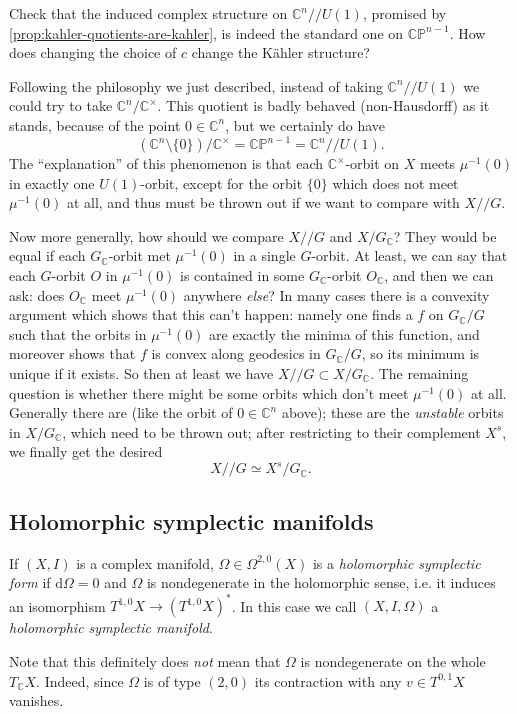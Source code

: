 \documentclass[12pt,letterpaper,reqno]{article}
\numberwithin{equation}{section}
\newcommand{\C}{\ensuremath{\mathbb C}}
\newcommand{\PP}{\ensuremath{\mathbb P}}
\newcommand{\kahler}{K\"ahler\xspace}
\newcommand{\kq}{/\!\!/}
\newcommand{\de}{\mathrm{d}}
\newcommand{\ti}[1]{\textit{#1}}
\begin{document}
\begin{exercise}
Check that the induced complex structure on $\C^n \kq U(1)$,
promised by \autoref{prop:kahler-quotients-are-kahler}, is indeed
the standard one on $\C\PP^{n-1}$. How does changing
the choice of $c$ change the \kahler structure?
\end{exercise}

Following the philosophy we just described, instead of taking
$\C^n \kq U(1)$ we could try to take $\C^n / \C^\times$.
This quotient is badly behaved (non-Hausdorff) as it stands, because of the
point $0 \in \C^n$, but we certainly do have
\begin{equation}
  (\C^n \setminus \{0\}) / \C^\times = \C\PP^{n-1} = \C^n \kq U(1).
\end{equation}
The ``explanation'' of this phenomenon is that each 
$\C^\times$-orbit on $X$ meets $\mu^{-1}(0)$ in
exactly one $U(1)$-orbit, 
except for the orbit $\{0\}$ which does not 
meet $\mu^{-1}(0)$ at all, and thus must be thrown out 
if we want to compare with $X \kq G$.

Now more generally, how should we compare $X \kq G$ and $X / G_\C$?
They would be equal if each $G_\C$-orbit met $\mu^{-1}(0)$
in a single $G$-orbit. At least, we can say that
each $G$-orbit $O$ in $\mu^{-1}(0)$ is contained in some $G_\C$-orbit $O_\C$,
and then we can ask: does $O_\C$ meet $\mu^{-1}(0)$ anywhere \ti{else}?
In many cases there is a convexity argument which shows 
that this can't happen: namely one finds a $f$ on $G_\C / G$ 
such that the orbits in $\mu^{-1}(0)$ are
exactly the minima of this function, and moreover shows that $f$ 
is convex along geodesics in $G_\C / G$, so its minimum is unique
if it exists. So then at least we have 
$X \kq G \subset X / G_\C$. The remaining question is whether there might
be some orbits which don't meet $\mu^{-1}(0)$ at all. Generally there are
(like the orbit of $0 \in \C^n$ above);
these are the \ti{unstable} orbits in $X / G_\C$, which need to be 
thrown out; after restricting to their complement $X^s$, we finally get
the desired
\begin{equation}
  X \kq G \simeq X^s / G_\C.
\end{equation}


\subsection{Holomorphic symplectic manifolds}

\begin{defn} If $(X,I)$ is a complex manifold, 
$\Omega \in \Omega^{2,0}(X)$ is a \ti{holomorphic
symplectic form} if $\de \Omega = 0$
and $\Omega$ is nondegenerate
in the holomorphic sense, i.e. it induces
an isomorphism $T^{1,0}X \to (T^{1,0} X)^*$.
In this case we call $(X,I,\Omega)$ a \ti{holomorphic symplectic
manifold}.
\end{defn}
Note that this definitely does \ti{not} mean that $\Omega$ is nondegenerate on the whole $T_\C X$. Indeed, since $\Omega$ is 
of type $(2,0)$ its contraction with any $v \in T^{0,1} X$ vanishes.
\end{document}
